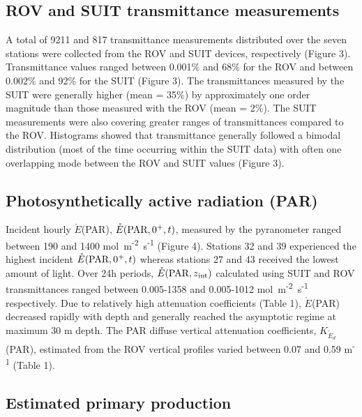 \documentclass[draft]{agujournal2018}
\newcommand{\kdparscalar}{\ensuremath{K_{\mathring{E}_d}}(\textnormal{PAR})}
\newcommand{\eparscalar}{\ensuremath{\mathring{E}}(\textnormal{PAR})}
\newcommand{\eparzintscalar}{\ensuremath{\mathring{E}(\textnormal{PAR}, z\textsubscript{int})}}
\newcommand{\eparzeroscalar}{\ensuremath{\mathring{E}(\textnormal{PAR}, 0^+, t)}}
\newcommand{\micromol}{\textmu mol~m\textsuperscript{-2}~s\textsuperscript{-1}}
\begin{document}
\subsection{ROV and SUIT transmittance measurements}

A total of 9211 and 817 transmittance measurements distributed over the seven stations were collected from the ROV and SUIT devices, respectively (Figure 3). Transmittance values ranged between 0.001\% and 68\% for the ROV and between 0.002\% and 92\% for the SUIT (Figure 3). The transmittances measured by the SUIT were generally higher (mean = 35\%) by approximately one order magnitude than those measured with the ROV (mean = 2\%). The SUIT measurements were also covering greater ranges of transmittances compared to the ROV. Histograms showed that transmittance generally followed a bimodal distribution (most of the time occurring within the SUIT data) with often one overlapping mode between the ROV and SUIT values (Figure 3). 

\subsection{Photosynthetically active radiation (PAR)}

Incident hourly \eparscalar{}, \eparzeroscalar{}, measured by the pyranometer ranged between 190 and 1400 \micromol{} (Figure 4). Stations 32 and 39 experienced the highest incident \eparzeroscalar{} whereas stations 27 and 43 received the lowest amount of light. Over 24h periods, \eparzintscalar{} calculated using SUIT and ROV transmittances ranged between 0.005-1358 and 0.005-1012 \micromol{} respectively. Due to relatively high attenuation coefficients (Table 1), \eparscalar{} decreased rapidly with depth and generally reached the asymptotic regime at maximum 30 m depth. The PAR diffuse vertical attenuation coefficients, \kdparscalar{}, estimated from the ROV vertical profiles varied between 0.07 and 0.59 m\textsuperscript{-1} (Table 1).

\subsection{Estimated primary production}
\end{document}
